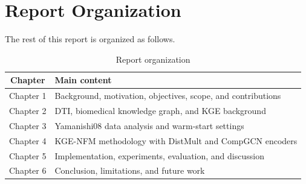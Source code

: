 \section{Report Organization}

The rest of this report is organized as follows.

\begin{table}[H]
\centering
\caption{Report organization}
\label{tab:report_organization}
\begin{tabular}{cl}
\toprule
\textbf{Chapter} & \textbf{Main content} \\
\midrule
Chapter 1 & Background, motivation, objectives, scope, and contributions \\
Chapter 2 & DTI, biomedical knowledge graph, and KGE background \\
Chapter 3 & Yamanishi08 data analysis and warm-start settings \\
Chapter 4 & KGE-NFM methodology with DistMult and CompGCN encoders \\
Chapter 5 & Implementation, experiments, evaluation, and discussion \\
Chapter 6 & Conclusion, limitations, and future work \\
\bottomrule
\end{tabular}
\end{table}

